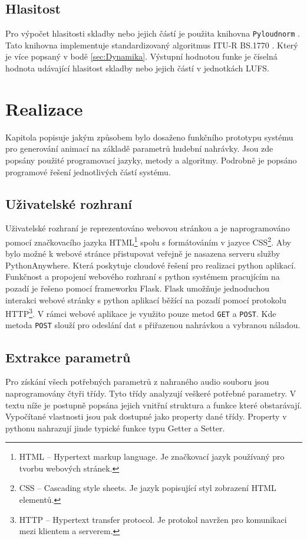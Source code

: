 \subsection{Hlasitost}
Pro výpočet hlasitosti skladby nebo jejich částí je použita knihovna \texttt{Pyloudnorm} \cite{Pyloudnorm}. Tato knihovna implementuje standardizovaný algoritmus ITU-R BS.1770 \cite{BS.1770}. Který je více popsaný v bodě \ref{sec:Dynamika}. Výstupní hodnotou funke je číselná hodnota udávající hlasitost skladby nebo jejich částí v jednotkách LUFS. 

\section{Realizace} \label{sec:Realizace}

Kapitola popisuje jakým způsobem bylo dosaženo funkčního prototypu systému pro generování animací na základě parametrů hudební nahrávky. Jsou zde popsány použité programovací jazyky, metody a algoritmy. Podrobně je popsáno programové řešení jednotlivých částí systému. 

\subsection{Uživatelské rozhraní}

Uživatelské rozhraní je reprezentováno webovou stránkou a je naprogramováno pomocí značkovacího jazyka \acs{HTML}\footnote{HTML -- Hypertext markup language. Je značkovací jazyk používaný pro tvorbu webových stránek.} spolu s formátováním v jazyce \acs{CSS}\footnote{CSS -- Cascading style sheets. Je jazyk popisující styl zobrazení HTML elementů\cite{CSS}.}. Aby bylo možné k webové stránce přistupovat veřejně je nasazena serveru služby PythonAnywhere. Která poskytuje cloudové řešení pro realizaci python aplikací. Funkčnost a propojení webového rozhraní s python systémem pracujícím na pozadí je řešeno pomocí frameworku Flask. Flask umožňuje jednoduchou interakci webové stránky s python aplikací běžící na pozadí pomocí protokolu HTTP\footnote{HTTP -- Hypertext transfer protocol. Je protokol navržen pro komunikaci mezi klientem a serverem.}. V rámci webové aplikace je využito pouze metod \texttt{GET} a \texttt{POST}. Kde metoda \texttt{POST} slouží pro odeslání dat s přiřazenou nahrávkou a vybranou náladou.

\subsection{Extrakce parametrů} \label{sec:Parameter_extraction}
Pro získání všech potřebných parametrů z nahraného audio souboru jsou naprogramovány čtyři třídy. Tyto třídy analyzují veškeré potřebné parametry. V textu níže je postupně popsána jejich vnitřní struktura a funkce které obstarávají. Vypočítané vlastnosti jsou pak dostupné jako property dané třídy. Property v pythonu nahrazují jinde typické funkce typu Getter a Setter.

